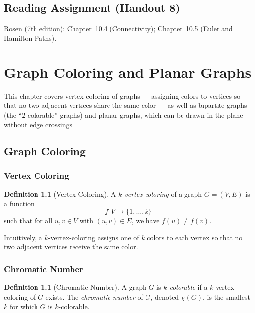 \documentclass[11pt, a4paper, notitlepage]{report}
\theoremstyle{definition}
\newtheorem{definition}[theorem]{Definition}
\theoremstyle{remark}
\begin{document}
\section*{Reading Assignment (Handout 8)}
Rosen (7th edition): Chapter~10.4 (Connectivity);
Chapter~10.5 (Euler and Hamilton Paths).

\chapter{Graph Coloring and Planar Graphs}
\label{chap:coloring-planar}

This chapter covers vertex coloring of graphs --- assigning colors to vertices so that no two adjacent vertices share the same color --- as well as bipartite graphs (the ``$2$-colorable'' graphs) and planar graphs, which can be drawn in the plane without edge crossings.

\section{Graph Coloring}
\label{sec:graph-coloring}

\subsection{Vertex Coloring}
\label{subsec:vertex-coloring}

\begin{definition}[Vertex Coloring]
\label{def:k-vertex-coloring}
A \emph{$k$-vertex-coloring} of a graph $G = (V, E)$ is a function
\[
f \colon V \to \{1, \ldots, k\}
\]
such that for all $u, v \in V$ with $(u,v) \in E$, we have $f(u) \neq f(v)$.
\end{definition}

Intuitively, a $k$-vertex-coloring assigns one of $k$ colors to each vertex so that no two adjacent vertices receive the same color.

\subsection{Chromatic Number}
\label{subsec:chromatic-number}

\begin{definition}[Chromatic Number]
\label{def:chromatic-number}
A graph $G$ is \emph{$k$-colorable} if a $k$-vertex-coloring of $G$ exists. The \emph{chromatic number} of $G$, denoted $\chi(G)$, is the smallest $k$ for which $G$ is $k$-colorable.
\end{definition}
\end{document}
